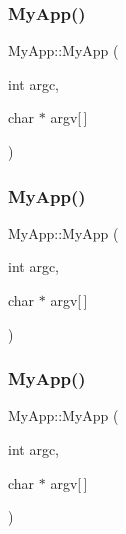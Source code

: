 \mbox{\label{class_my_app_a2cedcf8942b99702d5e26db7d07ff57b}} 
\subsubsection{\texorpdfstring{My\+App()}{MyApp()}\hspace{0.1cm}{\footnotesize\ttfamily [5/8]}}
{\footnotesize\ttfamily My\+App\+::\+My\+App (\begin{DoxyParamCaption}\item[{int}]{argc,  }\item[{char $\ast$}]{argv\mbox{[}$\,$\mbox{]} }\end{DoxyParamCaption})\hspace{0.3cm}{\ttfamily [inline]}}

\mbox{\label{class_my_app_a2cedcf8942b99702d5e26db7d07ff57b}} 
\subsubsection{\texorpdfstring{My\+App()}{MyApp()}\hspace{0.1cm}{\footnotesize\ttfamily [6/8]}}
{\footnotesize\ttfamily My\+App\+::\+My\+App (\begin{DoxyParamCaption}\item[{int}]{argc,  }\item[{char $\ast$}]{argv\mbox{[}$\,$\mbox{]} }\end{DoxyParamCaption})\hspace{0.3cm}{\ttfamily [inline]}}

\mbox{\label{class_my_app_a2cedcf8942b99702d5e26db7d07ff57b}} 
\subsubsection{\texorpdfstring{My\+App()}{MyApp()}\hspace{0.1cm}{\footnotesize\ttfamily [7/8]}}
{\footnotesize\ttfamily My\+App\+::\+My\+App (\begin{DoxyParamCaption}\item[{int}]{argc,  }\item[{char $\ast$}]{argv\mbox{[}$\,$\mbox{]} }\end{DoxyParamCaption})\hspace{0.3cm}{\ttfamily [inline]}}


